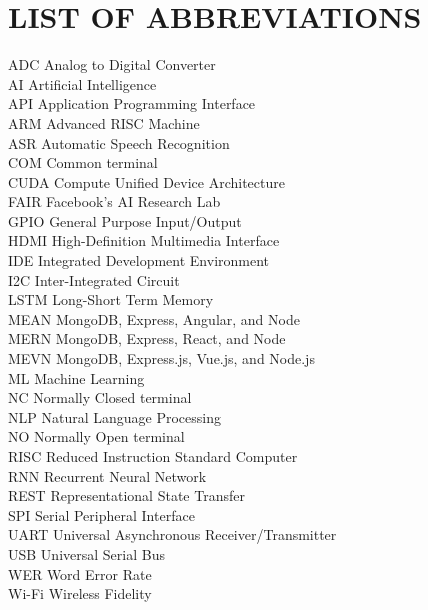 \chapter*{LIST OF ABBREVIATIONS}
ADC    \tabto{6em} Analog to Digital Converter \\
AI     \tabto{6em} Artificial Intelligence \\
API    \tabto{6em} Application Programming Interface \\
ARM    \tabto{6em} Advanced RISC Machine \\
ASR    \tabto{6em} Automatic Speech Recognition \\
COM    \tabto{6em} Common terminal \\
CUDA   \tabto{6em} Compute Unified Device Architecture \\
FAIR   \tabto{6em} Facebook's AI Research Lab \\
GPIO   \tabto{6em} General Purpose Input/Output \\
HDMI   \tabto{6em} High-Definition Multimedia Interface \\
IDE    \tabto{6em} Integrated Development Environment \\
I2C    \tabto{6em} Inter-Integrated Circuit \\
LSTM   \tabto{6em} Long-Short Term Memory \\
MEAN   \tabto{6em} MongoDB, Express, Angular, and Node \\
MERN   \tabto{6em} MongoDB, Express, React, and Node \\
MEVN   \tabto{6em} MongoDB, Express.js, Vue.js, and Node.js \\
ML     \tabto{6em} Machine Learning \\
NC     \tabto{6em} Normally Closed terminal \\
NLP    \tabto{6em} Natural Language Processing \\
NO     \tabto{6em} Normally Open terminal \\
RISC   \tabto{6em} Reduced Instruction Standard Computer \\
RNN    \tabto{6em} Recurrent Neural Network \\
REST   \tabto{6em} Representational State Transfer \\
SPI    \tabto{6em} Serial Peripheral Interface \\
UART   \tabto{6em} Universal Asynchronous Receiver/Transmitter \\
USB    \tabto{6em} Universal Serial Bus \\
WER    \tabto{6em} Word Error Rate \\
Wi-Fi  \tabto{6em} Wireless Fidelity \\
